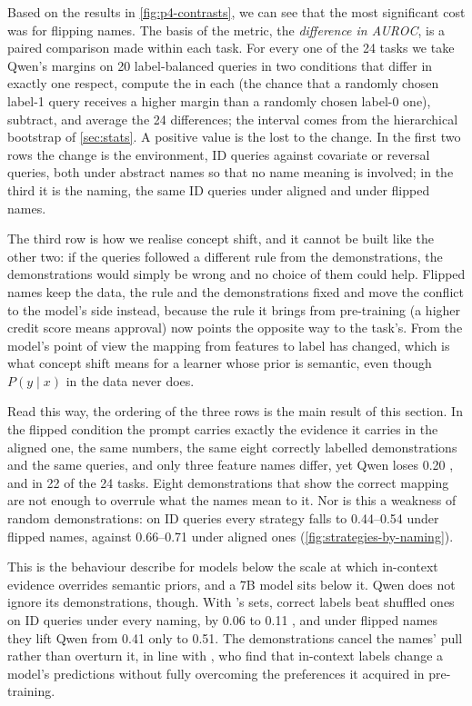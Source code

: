 Based on the results in \autoref{fig:p4-contrasts}, we can see that the most significant cost was for flipping names. The basis of the metric, the \emph{difference in AUROC}, is a paired comparison made within each task. For every one of the 24 tasks we take Qwen's margins on 20 label-balanced queries in two conditions that differ in exactly one respect, compute the \AUROC in each (the chance that a randomly chosen label-1 query receives a higher margin than a randomly chosen label-0 one), subtract, and average the 24 differences; the interval comes from the hierarchical bootstrap of \autoref{sec:stats}. A positive value is the \AUROC lost to the change. In the first two rows the change is the environment, ID queries against covariate or reversal queries, both under abstract names so that no name meaning is involved; in the third it is the naming, the same ID queries under aligned and under flipped names.

The third row is how we realise concept shift, and it cannot be built like the other two: if the queries followed a different rule from the demonstrations, the demonstrations would simply be wrong and no choice of them could help. Flipped names keep the data, the rule and the demonstrations fixed and move the conflict to the model's side instead, because the rule it brings from pre-training (a higher credit score means approval) now points the opposite way to the task's. From the model's point of view the mapping from features to label has changed, which is what concept shift means for a learner whose prior is semantic, even though $P(y \mid x)$ in the data never does.

Read this way, the ordering of the three rows is the main result of this section. In the flipped condition the prompt carries exactly the evidence it carries in the aligned one, the same numbers, the same eight correctly labelled demonstrations and the same queries, and only three feature names differ, yet Qwen loses 0.20 \AUROC, and in 22 of the 24 tasks. Eight demonstrations that show the correct mapping are not enough to overrule what the names mean to it. Nor is this a weakness of random demonstrations: on ID queries every strategy falls to 0.44--0.54 under flipped names, against 0.66--0.71 under aligned ones (\autoref{fig:strategies-by-naming}).

This is the behaviour \citet{wei2023larger} describe for models below the scale at which in-context evidence overrides semantic priors, and a 7B model sits below it. Qwen does not ignore its demonstrations, though. With 's sets, correct labels beat shuffled ones on ID queries under every naming, by 0.06 to 0.11 \AUROC, and under flipped names they lift Qwen from 0.41 only to 0.51. The demonstrations cancel the names' pull rather than overturn it, in line with \citet{kossen2024incontext}, who find that in-context labels change a model's predictions without fully overcoming the preferences it acquired in pre-training.

